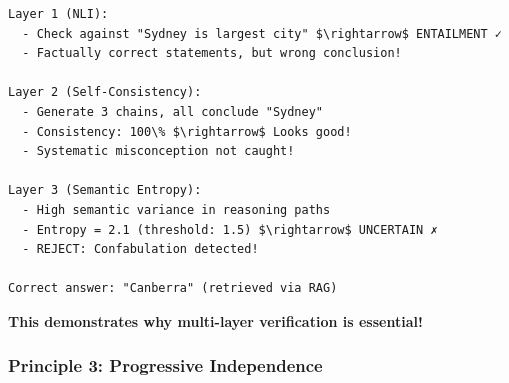 \documentclass[12pt,a4paper]{article}
\theoremstyle{definition}
\begin{document}
\begin{keyinsightbox}
\begin{verbatim}
Layer 1 (NLI): 
  - Check against "Sydney is largest city" $\rightarrow$ ENTAILMENT ✓
  - Factually correct statements, but wrong conclusion!
  
Layer 2 (Self-Consistency):
  - Generate 3 chains, all conclude "Sydney" 
  - Consistency: 100\% $\rightarrow$ Looks good!
  - Systematic misconception not caught!
  
Layer 3 (Semantic Entropy):
  - High semantic variance in reasoning paths
  - Entropy = 2.1 (threshold: 1.5) $\rightarrow$ UNCERTAIN ✗
  - REJECT: Confabulation detected!

Correct answer: "Canberra" (retrieved via RAG)
\end{verbatim}

\textbf{This demonstrates why multi-layer verification is essential!}
\end{keyinsightbox}

\subsubsection{Principle 3: Progressive Independence}
\end{document}
